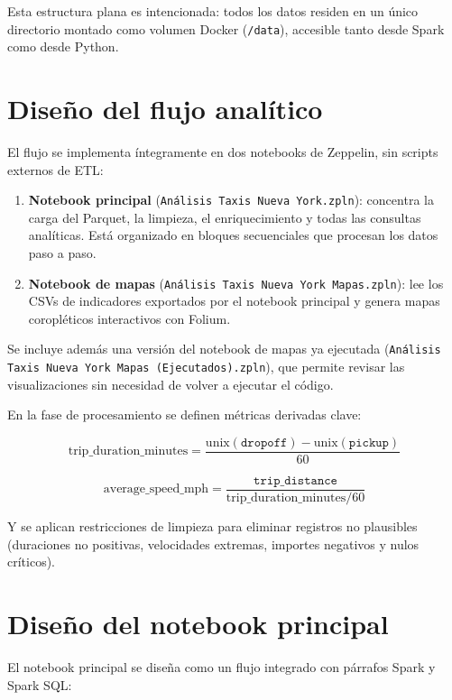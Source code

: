 Esta estructura plana es intencionada: todos los datos residen en un único directorio
montado como volumen Docker (\texttt{/data}), accesible tanto desde Spark como desde
Python.

\section{Diseño del flujo analítico}
El flujo se implementa íntegramente en dos notebooks de Zeppelin, sin scripts
externos de ETL:

\begin{enumerate}
	\item \textbf{Notebook principal}
	(\texttt{Análisis Taxis Nueva York.zpln}): concentra la carga del Parquet,
	la limpieza, el enriquecimiento y todas las consultas analíticas. Está
	organizado en bloques secuenciales que procesan los datos paso a paso.
	\item \textbf{Notebook de mapas}
	(\texttt{Análisis Taxis Nueva York Mapas.zpln}): lee los CSVs de indicadores
	exportados por el notebook principal y genera mapas coropléticos interactivos
	con Folium.
\end{enumerate}

Se incluye además una versión del notebook de mapas ya ejecutada
(\texttt{Análisis Taxis Nueva York Mapas (Ejecutados).zpln}), que permite revisar
las visualizaciones sin necesidad de volver a ejecutar el código.

En la fase de procesamiento se definen métricas derivadas clave:

\[
\text{trip\_duration\_minutes} =
\frac{\text{unix}(\texttt{dropoff}) - \text{unix}(\texttt{pickup})}{60}
\]

\[
\text{average\_speed\_mph} =
\frac{\texttt{trip\_distance}}{\text{trip\_duration\_minutes} / 60}
\]

Y se aplican restricciones de limpieza para eliminar registros no plausibles
(duraciones no positivas, velocidades extremas, importes negativos y nulos críticos).

\section{Diseño del notebook principal}
El notebook principal se diseña como un flujo integrado con párrafos Spark y
Spark SQL:

